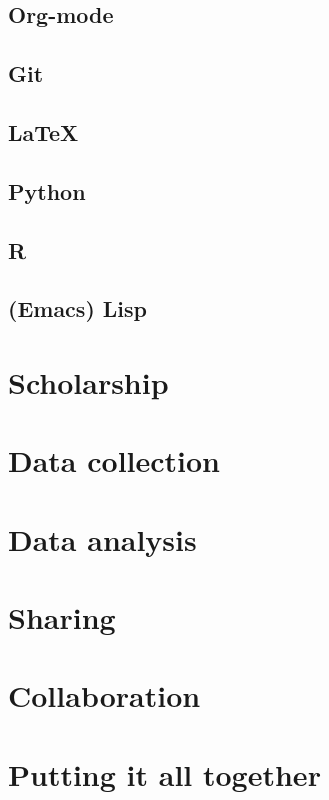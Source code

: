 \documentclass{book}
\begin{document}
\subsection{Org-mode}
\label{sec-11-2-2}
\subsection{Git}
\label{sec-11-2-3}
\subsection{\LaTeX{}}
\label{sec-11-2-4}
\subsection{Python}
\label{sec-11-2-5}
\subsection{R}
\label{sec-11-2-6}
\subsection{(Emacs) Lisp}
\label{sec-11-2-7}
\section{Scholarship}
\label{sec-11-3}
\section{Data collection}
\label{sec-11-4}
\section{Data analysis}
\label{sec-11-5}
\section{Sharing}
\label{sec-11-6}
\section{Collaboration}
\label{sec-11-7}
\section{Putting it all together}
\label{sec-11-8}


\printbibliography
\end{document}
